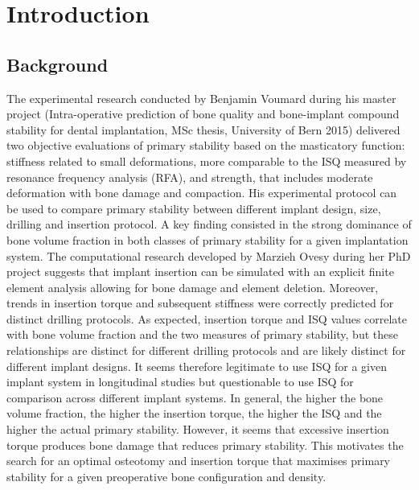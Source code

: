 \documentclass[12pt, a4paper, twoside]{report}
\begin{document}
                        
                    
                        
\tableofcontents
\mainmatter
\clearpage       
%
%
%
%
%
%
%
\chapter{Introduction}
%
%
%
\section{Background}
%
The experimental research conducted by Benjamin Voumard during his master project (Intra-operative prediction of bone quality and bone-implant compound stability for dental implantation, MSc thesis, University of Bern 2015) delivered two objective evaluations of primary stability based on the masticatory function: stiffness related to small deformations, more comparable to the ISQ measured by resonance frequency analysis (RFA), and strength, that includes moderate deformation with bone damage and compaction. His experimental protocol can be used to compare primary stability between different implant design, size, drilling and insertion protocol. A key finding consisted in the strong dominance of bone volume fraction in both classes of primary stability for a given implantation system.
The computational research developed by Marzieh Ovesy during her PhD project suggests that implant insertion can be simulated with an explicit finite element analysis allowing for bone damage and element deletion. Moreover, trends in insertion torque and subsequent stiffness were correctly predicted for distinct drilling protocols. As expected, insertion torque and ISQ values correlate with bone volume fraction and the two measures of primary stability, but these relationships are distinct for different drilling protocols and are likely distinct for different implant designs. It seems therefore legitimate to use ISQ for a given implant system in longitudinal studies but questionable to use ISQ for comparison across different implant systems.
In general, the higher the bone volume fraction, the higher the insertion torque, the higher the ISQ and the higher the actual primary stability. However, it seems that excessive insertion torque produces bone damage that reduces primary stability. This motivates the search for an optimal osteotomy and insertion torque that maximises primary stability for a given preoperative bone configuration and density.
%
%
%
\end{document}
